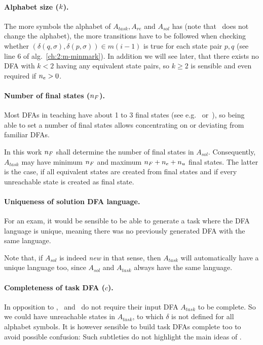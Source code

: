 \paragraph*{Alphabet size \texorpdfstring{($k$)}{}.}

The more symbols the alphabet of $A_{task}, A_{re}$ and $A_{sol}$ has (note that \MinAlg\ does not change the alphabet), the more transitions have to be followed when checking whether $(\delta(q,\sigma),\delta(p,\sigma))\in m(i-1)$ is true for each state pair $p,q$ (see line 6 of alg.~\ref{ch:2:m-minmark}). In addition we will see later, that there exists no DFA with $k<2$ having any equivalent state pairs, so $k\ge 2$ is sensible and even required if ${n_e} > 0$.

\paragraph*{Number of final states \texorpdfstring{(${n_F}$)}{}.}

Most DFAs in teaching have about 1 to 3 final states (see e.g.~\cite[pp. 48-78]{HMU01} or~\cite[pp. 28-48]{Sch01}), so being able to set a number of final states allows concentrating on or deviating from familiar DFAs.

In this work ${n_F}$ shall determine the number of final states in $A_{sol}$. Consequently, $A_{task}$ may have minimum ${n_F}$ and maximum ${n_F} + {n_e} + {n_u}$ final states. The latter is the case, if all equivalent states are created from final states and if every unreachable state is created as final state.

\paragraph*{Uniqueness of solution DFA language.}

For an exam, it would be sensible to be able to generate a task where the DFA language is unique, meaning there was no previously generated DFA with the same language.

Note that, if $A_{sol}$ is indeed \emph{new} in that sense, then $A_{task}$ will automatically have a unique language too, since $A_{sol}$ and $A_{task}$ always have the same language.

\paragraph*{Completeness of task DFA \texorpdfstring{($c$)}{}.}

In opposition to \CompDist, \CompUnr\ and \RemUnr\ do not require their input DFA $A_{task}$ to be complete. So we could have unreachable states in $A_{task}$, to which $\delta$ is not defined for all alphabet symbols. It is however sensible to build task DFAs complete too to avoid possible confusion: Such subtleties do not highlight the main ideas of \MinAlg.

